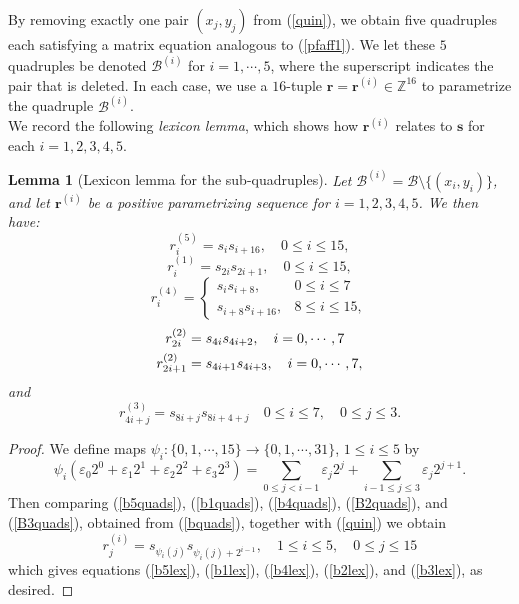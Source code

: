 \documentclass[letterpaper,10pt]{amsart}
\newcommand{\bZ}{{\mathbb{Z}}}
\newcommand{\Br}{{\mathbf{r}}}
\newcommand{\Bs}{{\mathbf{s}}}
\newcommand{\B}{{\mathcal{B}}}
\newcommand{\ep}{\varepsilon}
\newtheorem{lemma}[theorem]{Lemma}
\theoremstyle{definition}
\numberwithin{equation}{section}
\begin{document}
By removing exactly one pair $(x_j, y_j)$ from (\ref{quin}), we obtain five quadruples each satisfying a matrix equation analogous to (\ref{pfaff1}). We let these $5$ quadruples be denoted $\B^{(i)}$ for $i = 1, \cdots, 5$, where the superscript indicates the pair that is deleted. In each case, we use a $16$-tuple $\Br = \Br^{(i)} \in \bZ^{16}$ to parametrize the quadruple $\B^{(i)}$. \\

We record the following \emph{lexicon lemma}, which shows how $\Br^{(i)}$ relates to $\Bs$ for each $i = 1,2,3,4,5$. 

\begin{lemma}[Lexicon lemma for the sub-quadruples] \label{lexlem} Let $\B^{(i)} = \B \setminus \{(x_i, y _i)\}$, and let $\Br^{(i)}$ be a positive parametrizing sequence for $i = 1,2,3,4,5$. We then have: 
\begin{equation} \label{b5lex} r_i^{(5)} = s_i s_{i + 16}, \quad 0 \leq i \leq 15,
\end{equation}
\begin{equation}\label{b1lex} r_i^{(1)} = s_{2i} s_{2i+1}, \quad 0 \leq i \leq 15,
\end{equation}
\begin{equation} \label{b4lex} 
r_i^{(4)}  = \begin{cases}  s_i s_{i+8}, & 0 \leq i \leq 7 \\
 s_{i+8} s_{i+16}, & 8 \leq i \leq 15, 
\end{cases}
\end{equation}
\begin{align} \label{b2lex} 
r_{2i}^{(2)} & = s_{4i} s_{4i+2}, \quad i = 0, \cdots, 7 \\
r_{2i+1}^{(2)} & = s_{4i+1} s_{4i+3}, \quad i = 0, \cdots, 7, \notag
\end{align}
and
\begin{equation} \label{b3lex} 
r_{4i + j}^{(3)} = s_{8i + j} s_{8i + 4 + j} \quad 0 \leq i \leq 7, \quad 0 \leq j \leq 3.
\end{equation}
\end{lemma}

\begin{proof} We define maps $\psi_i : \{0, 1, \cdots, 15\} \rightarrow \{0, 1, \cdots, 31\}$, $1 \leq i \leq 5$ by 
\begin{equation} \psi_i \left(\ep_0 2^0 + \ep_1 2^1 + \ep_2 2^2 + \ep_3 2^3  \right)  = \sum_{0 \leq j < i-1} \ep_j 2^j + \sum_{i-1 \leq j \leq 3} \ep_j 2^{j+1}.
\end{equation}
Then comparing (\ref{b5quads}), (\ref{b1quads}), (\ref{b4quads}), (\ref{B2quads}), and (\ref{B3quads}), obtained from (\ref{bquads}), together with (\ref{quin}) we obtain
\begin{equation} \label{mainlexeq} r_j^{(i)} = s_{\psi_i(j)} s_{\psi_i(j) + 2^{i-1}}, \quad 1 \leq i \leq 5, \quad 0 \leq j \leq 15
\end{equation} 
which gives equations (\ref{b5lex}), (\ref{b1lex}), (\ref{b4lex}), (\ref{b2lex}), and (\ref{b3lex}), as desired. 
\end{proof} 
\end{document}
